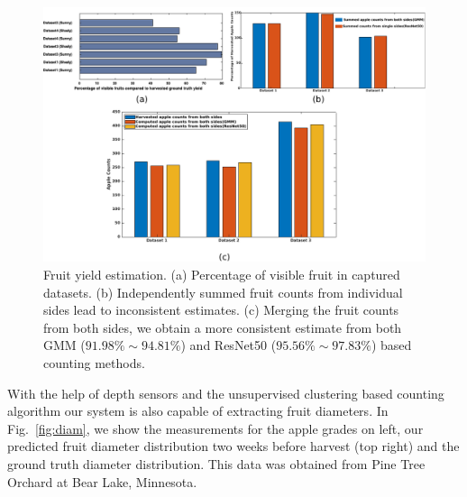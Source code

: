 \begin{figure}[!hbpt]

        \centering     
        
            \includegraphics[width =\textwidth]{figures/map_yield/full_yield.pdf}         
        
  
   \caption[Fruit yield estimation - the percentage of visible fruit and single side vs both sides counts.]{Fruit yield estimation. (a) Percentage of visible fruit in captured datasets. (b) Independently summed fruit counts from individual sides lead to inconsistent estimates. (c) Merging the fruit counts from both sides, we obtain a more consistent estimate from both GMM ($91.98\%\sim94.81\%$) and ResNet50 ($95.56\%\sim97.83\%$) based counting methods.}
    \label{fig:bothsideyield}
\end{figure} 

With the help of depth sensors and the unsupervised clustering based counting algorithm our system is also capable of extracting fruit diameters. In Fig.~\ref{fig:diam}, we show the measurements for the apple grades on left, our predicted fruit diameter distribution two weeks before harvest (top right) and the ground truth diameter distribution. This data was obtained from Pine Tree Orchard at Bear Lake, Minnesota.


